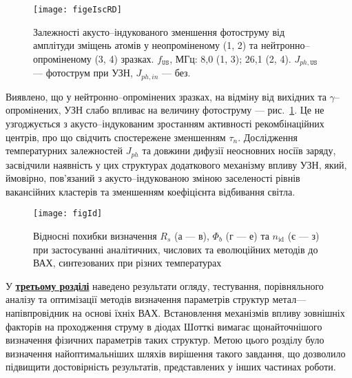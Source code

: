 \begin{figure}[ht]
\center
\texttt{[image: figeIscRD]}
\caption{\label{figeIscRD}
Залежності акусто--індукованого зменшення фотоструму від
амплітуди зміщень атомів у неопроміненому (1, 2)
та нейтронно--опроміненому (3, 4) зразках.
$f_\mathtt{US}$, МГц: 8,0 (1, 3);
26,1 (2, 4).
$J_{ph,\mathtt{US}}$ --- фотострум при УЗН,
$J_{ph,in}$ --- без.
}%
\end{figure}

Виявлено, що у нейтронно--опромінених зразках, на відміну від вихідних та  $\gamma$--опромінених, УЗН слабо впливає на величину фотоструму --- рис.~\ref{figeIscRD}.
Це не узгоджується з акусто--індукованим зростанням активності рекомбінаційних центрів, про що свідчить спостережене зменшенням $\tau_n$.
Дослідження температурних залежностей $J_{ph}$ та довжини дифузії неосновних носіїв заряду,
засвідчили наявність у цих структурах додаткового механізму впливу УЗН, який, ймовірно, пов'язаний з акусто--індукованою зміною заселеності рівнів вакансійних кластерів та зменшенням коефіцієнта відбивання світла.


\begin{figure}
\center
\texttt{[image: figId]}%
\caption{\label{figId}
Відносні похибки визначення $R_s$ (а --- в), $\Phi_b$ (г --- е) та $n_\mathrm{id}$ (є --- з)
при застосуванні аналітичних, числових та еволюційних методів до ВАХ, синтезованих при різних температурах
}
\end{figure}


У  \underline{\textbf{третьому розділі}} наведено результати огляду, тестування, порівняльного аналізу та оптимізації методів
визначення параметрів структур
метал---напівпровідник на основі їхніх ВАХ.
Встановлення механізмів впливу зовнішніх факторів на проходження струму в діодах Шотткі вимагає щонайточнішого визначення фізичних
параметрів таких структур.
 Метою цього розділу було визначення найоптимальніших шляхів вирішення такого завдання, що дозволило підвищити достовірність результатів, представлених у інших частинах роботи.

